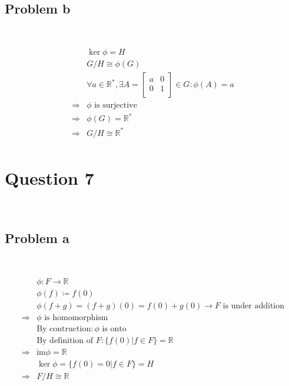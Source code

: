\documentclass{article}
\begin{document}
~

\subsection*{Problem b}

~

\begin{equation*}
    \begin{split}
        &\ker\phi=H\\
        &G/H\cong \phi(G)\\
        &\forall a\in \mathbb{R} ^*,\exists A=\begin{bmatrix}
            a&0\\
            0&1\\
        \end{bmatrix}\in G: \phi(A)=a\\
        \Rightarrow&\phi\text{ is surjective}\\
        \Rightarrow&\phi(G)=\mathbb{R} ^*\\
        \Rightarrow&G/H\cong\mathbb{R} ^*\\
    \end{split}
\end{equation*}

\newpage

\section*{Question 7}

~

\subsection*{Problem a}

~

\begin{equation*}
    \begin{split}
        &\phi:F\rightarrow\mathbb{R}\\
        &\phi(f)\coloneqq f(0)\\
        &\phi(f+g)=(f+g)(0)=f(0)+g(0)\rightarrow F\text{ is under addition}\\
        \Rightarrow&\phi\text{ is homomorphism}\\
        &\text{By contruction}:\phi\text{ is onto}\\
        &\text{By definition of }F:\{f(0)|f\in F\}=\mathbb{R} \\
        \Rightarrow&\text{im}\phi=\mathbb{R} \\
        &\ker\phi=\{f(0)=0|f\in F\}=H\\
        \Rightarrow&F/H\cong\mathbb{R} \\
    \end{split}
\end{equation*}
\end{document}
